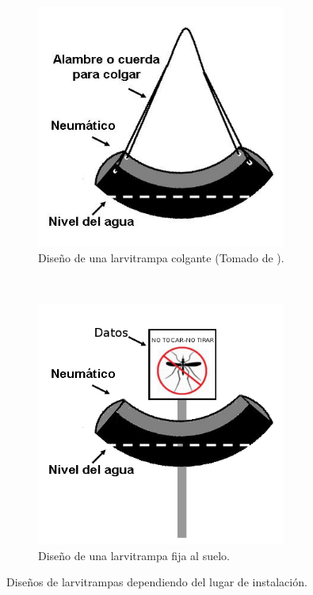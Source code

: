 \begin{figure}[!htbp]
    \centering
    \begin{subfigure}[b]{0.45\textwidth}
        \includegraphics[width=0.9\textwidth]{anexos/graphics/disenho-1.png}
        \caption{\label{fig:anexo-disenho-1} Diseño de una larvitrampa colgante (Tomado de
        \cite{manualControlArg2009}).}
    \end{subfigure}
    ~~~~
    \begin{subfigure}[b]{0.45\textwidth}
        \includegraphics[width=0.9\textwidth]{anexos/graphics/disenho-2.png}
        \caption{\label{fig:anexo-disenho-2} Diseño de una larvitrampa fija al suelo.}
    \end{subfigure}
    \caption{\label{fig:disenhos-larvitrampas} Diseños de larvitrampas dependiendo del lugar de instalación.}
\end{figure}

